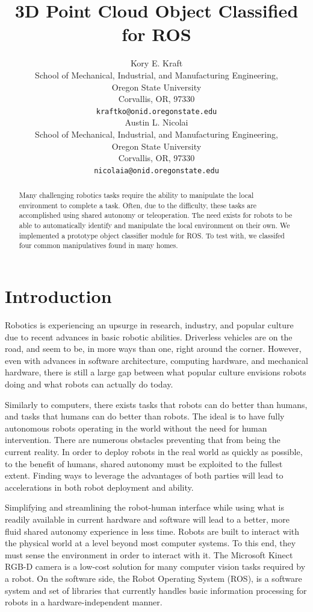 \documentclass{article}
\title{\LARGE \bf 
3D Point Cloud Object Classified for ROS
}
\author{
Kory E. Kraft\\
School of Mechanical, Industrial, and Manufacturing Engineering,\\
Oregon State University\\
Corvallis, OR, 97330\\
\texttt{kraftko@onid.oregonstate.edu} \\
\And
Austin L. Nicolai\\
School of Mechanical, Industrial, and Manufacturing Engineering,\\
Oregon State University\\
Corvallis, OR, 97330\\
\texttt{nicolaia@onid.oregonstate.edu} \\
}
\begin{document}
\maketitle
\thispagestyle{empty}
\pagestyle{empty}
\begin{abstract}
Many challenging robotics tasks require the ability to manipulate the local environment to complete a
task. Often, due to the difficulty, these tasks are accomplished using shared autonomy or teleoperation.
The need exists for robots to be able to automatically identify and manipulate the local environment on
their own. We implemented a prototype object classifier module for ROS. To test with, we classifed four common
manipulatives found in many homes.  
\end{abstract}


\section{Introduction}
Robotics is experiencing an upsurge in research, industry, and popular culture due to 
recent advances in basic robotic abilities.  Driverless vehicles are on the road, and seem to be, in more ways than 
one, right around the corner. However, even with advances in software architecture,
computing hardware, and mechanical hardware, there is still a large gap between what popular culture
 envisions robots doing and what robots can actually do today.

Similarly to computers, there exists tasks that robots can do better than humans, and tasks that humans can do
better than robots. The ideal is to have fully autonomous robots operating in the world without the need for human intervention.
There are numerous obstacles preventing that from being the current reality. In order to deploy robots in the real world as quickly as possible, to the benefit of humans, shared autonomy must be exploited to the fullest extent. Finding ways to leverage the advantages of both parties will lead to accelerations in both robot deployment and ability.

Simplifying and streamlining the robot-human interface while using what is readily available in current hardware and software will lead to a better, more fluid shared autonomy experience in less time. Robots are built to interact with the physical world at a level beyond most computer systems. To this end, they must sense the environment in order to interact with it. The Microsoft Kinect RGB-D camera is a low-cost solution for many computer vision tasks required by a robot. On the software side, the Robot Operating System (ROS), is a software system and set of libraries that currently handles basic information processing for robots in a hardware-independent manner.
\end{document}
